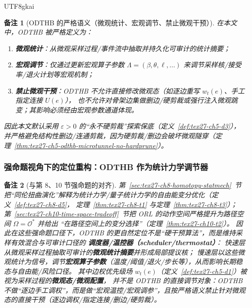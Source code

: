 \documentclass[12pt]{article}
\newtheorem{remark}{备注}[section]
\begin{document}
\begin{CJK*}{UTF8}{gkai}
\begin{remark}[ODTHB 的严格语义（微观统计、宏观调节、禁止微观干预）]
在本文中，ODTHB 被严格定义为：
\begin{enumerate}
  \item \textbf{微观统计}：从微观采样过程/事件流中抽取并持久化可审计的统计摘要；
  \item \textbf{宏观调节}：仅通过更新宏观算子参数 $\Lambda=(\beta,\theta,\ell,\ldots)$ 来调节采样核/接受率/退火计划等宏观机制；
  \item \textbf{禁止微观干预}：ODTHB 不允许直接修改微观态（如逐边重写 $w_t(e)$、手工指定连接 $U(e)$），
  也不允许对骨架边集做删边/硬剪裁或强行注入微观跳变；其影响必须经由宏观参数通道体现。
\end{enumerate}
因此本文默认采用 $\varepsilon>0$ 的“永不硬剪裁”探索保底（定义~\ref{def:tex27-ch5-d3}），
并严格避免结构性删边/连通剪裁，因为硬剪裁/删边会破坏微观隧穿（定理~\ref{thm:tex27-ch5-odthb-microtunnel-no-hardprune}）。
\end{remark}

\subsubsection{强命题视角下的定位重构：ODTHB 作为统计力学调节器}
\label{subsubsec:tex27-ch5-odthb-thermostat}

\begin{remark}[与第 8、10 节强命题的对齐]
第~\ref{sec:tex27-ch8-homotopy-statmech}~节把“同伦扭曲演化”解释为统计力学/量子统计力学的自由能变分优化（定义~\ref{def:tex27-ch8-d5}，
定理~\ref{thm:tex27-ch8-t1} 与定理~\ref{thm:tex27-ch8-t3}）；
第~\ref{sec:tex27-ch10-time-space-tradeoff}~节把 ORL 的动作空间严格提升为路径空间 $\Omega=\mathcal{O}^*$ 并给出
“在路径空间上的变分选择”（定理~\ref{thm:tex27-ch10-t2}）。
因此在这些强命题口径下，ODTHB 的更自然定位不是“硬干预算法”，而是维持采样有效混合与可审计口径的
\textbf{调度器/温控器（scheduler/thermostat）}：
快速层从微观采样过程抽取可审计的\textbf{微观统计摘要}并形成局部提议核；
慢速层以这些微观统计为信号，调节\textbf{宏观算子参数}（温度/阈值/退火/步长等），从而影响长期稳态与自由能/风险口径。
其中边权优先级场 $w_t(e)$（定义~\ref{def:tex27-ch5-d1}）被视为采样过程的\textbf{微观态/微观配置}，
并不是 ODTHB 的直接调节对象：ODTHB 不做“逐边手工调权”，而是做“宏观温控/宏观调参”，且按严格语义禁止针对微观态的直接干预（逐边调权/指定连接/删边/硬剪裁）。
\end{remark}


\end{CJK*}
\end{document}
